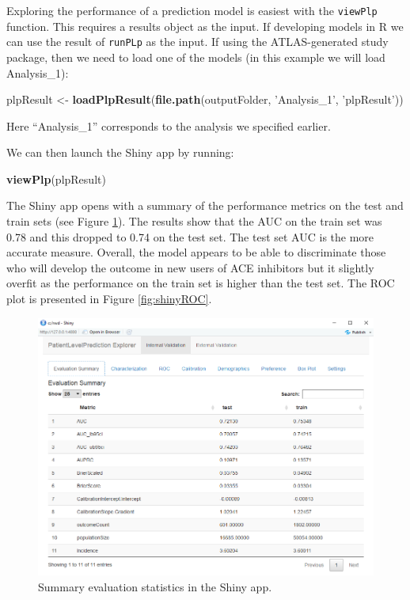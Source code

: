 \documentclass[11pt]{book}
\newenvironment{Shaded}{\begin{snugshade}}{\end{snugshade}}
\newcommand{\KeywordTok}[1]{\textcolor[rgb]{0.13,0.29,0.53}{\textbf{#1}}}
\newcommand{\StringTok}[1]{\textcolor[rgb]{0.31,0.60,0.02}{#1}}
\newcommand{\NormalTok}[1]{#1}
\theoremstyle{definition}
\theoremstyle{definition}
\theoremstyle{definition}
\theoremstyle{remark}
\begin{document}
Exploring the performance of a prediction model is easiest with the
\texttt{viewPlp} function. This requires a results object as the input.
If developing models in R we can use the result of \texttt{runPLp} as
the input. If using the ATLAS-generated study package, then we need to
load one of the models (in this example we will load Analysis\_1):

\begin{Shaded}
\begin{Highlighting}[]
\NormalTok{plpResult <-}\StringTok{ }\KeywordTok{loadPlpResult}\NormalTok{(}\KeywordTok{file.path}\NormalTok{(outputFolder, }
                                     \StringTok{'Analysis_1'}\NormalTok{, }
                                     \StringTok{'plpResult'}\NormalTok{))}
\end{Highlighting}
\end{Shaded}

Here ``Analysis\_1'' corresponds to the analysis we specified earlier.

We can then launch the Shiny app by running:

\begin{Shaded}
\begin{Highlighting}[]
\KeywordTok{viewPlp}\NormalTok{(plpResult)}
\end{Highlighting}
\end{Shaded}

The Shiny app opens with a summary of the performance metrics on the
test and train sets (see Figure \ref{fig:shinySummary}). The results
show that the AUC on the train set was 0.78 and this dropped to 0.74 on
the test set. The test set AUC is the more accurate measure. Overall,
the model appears to be able to discriminate those who will develop the
outcome in new users of ACE inhibitors but it slightly overfit as the
performance on the train set is higher than the test set. The ROC plot
is presented in Figure \ref{fig:shinyROC}.

\begin{figure}
\includegraphics[width=1\linewidth]{images/PatientLevelPrediction/shinysummary} \caption{Summary evaluation statistics in the Shiny app.}\label{fig:shinySummary}
\end{figure}
\end{document}
